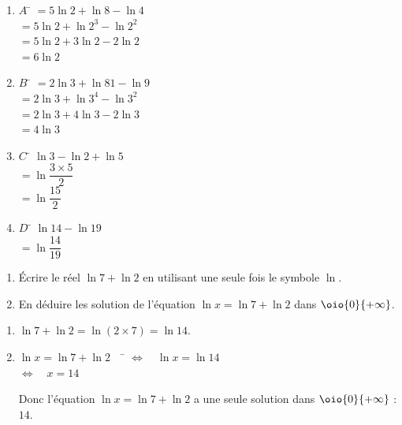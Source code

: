 \documentclass[a4paper,11pt,exos]{nsi} %
\begin{document}
\textcolor{UGLiBlue}{
    \begin{multicols}{2}
        \begin{enumerate}
            \item \begin{tabbing}
                $A$ \= $=5\ln 2+\ln 8-\ln 4$\\
                \>$=5\ln 2+\ln 2^3-\ln 2^2$\\
                \>$=5\ln 2+3\ln 2-2\ln 2$\\
                \>$=6\ln 2$
            \end{tabbing}
            \item \begin{tabbing}
                $B$ \= $=2\ln 3+\ln 81-\ln 9$\\
                \>$=2\ln 3+\ln 3^4-\ln 3^2$\\
                \>$=2\ln 3+4\ln 3-2\ln 3$\\
                \>$=4\ln 3$
            \end{tabbing}
            \columnbreak
            \item \begin{tabbing}
                $C$ \= $\ln 3-\ln 2+\ln 5$\\
                \> $=\ln \dfrac{3\times 5}{2}$\\
                \> $=\ln \dfrac{15}{2}$
            \end{tabbing}
            \item \begin{tabbing}
                $D$ \= $\ln 14-\ln 19$\\
                \> $=\ln \dfrac{14}{19}$
            \end{tabbing}
        \end{enumerate}
    \end{multicols}
}

\exo{}
\begin{enumerate}
    \item Écrire le réel $\ln 7 +\ln 2$ en utilisant une seule fois le symbole $\ln$.
    \item En déduire les solution de l'équation $\ln x=\ln 7 +\ln 2$ dans $\oio{0}{+\infty}$.
\end{enumerate}

\textcolor{UGLiBlue}{
    \begin{enumerate}
        \item $\ln 7 +\ln 2=\ln(2\times 7)=\ln 14$.
        \item \begin{tabbing}
            $\ln x=\ln 7 +\ln 2\quad$ \= $\iff \quad \ln x=\ln 14$\\
            \> $\iff \quad x=14$
        \end{tabbing}
        Donc l'équation $\ln x=\ln 7 +\ln 2$ a une seule solution dans $\oio{0}{+\infty}$ : $14$.
    \end{enumerate}
}
\end{document}
